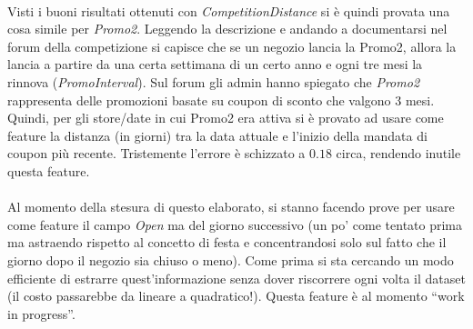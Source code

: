 \\
Visti i buoni risultati ottenuti con \textit{CompetitionDistance} si è quindi provata una cosa simile per \textit{Promo2}. Leggendo la descrizione e andando a documentarsi nel forum della competizione si capisce che se un negozio lancia la Promo2, allora la lancia a partire da una certa settimana di un certo anno e ogni tre mesi la rinnova (\textit{PromoInterval}). Sul forum gli admin hanno spiegato che \textit{Promo2} rappresenta delle promozioni basate su coupon di sconto che valgono 3 mesi. Quindi, per gli store/date in cui Promo2 era attiva si è provato ad usare come feature la distanza (in giorni) tra la data attuale e l'inizio della mandata di coupon più recente. Tristemente l'errore è schizzato a $0.18$ circa, rendendo inutile questa feature.\\
\\
Al momento della stesura di questo elaborato, si stanno facendo prove per usare come feature il campo \textit{Open} ma del giorno successivo (un po' come tentato prima ma astraendo rispetto al concetto di festa e concentrandosi solo sul fatto che il giorno dopo il negozio sia chiuso o meno). Come prima si sta cercando un modo efficiente di estrarre quest'informazione senza dover riscorrere ogni volta il dataset (il costo passarebbe da lineare a quadratico!). Questa feature è al momento ``work in progress''.
